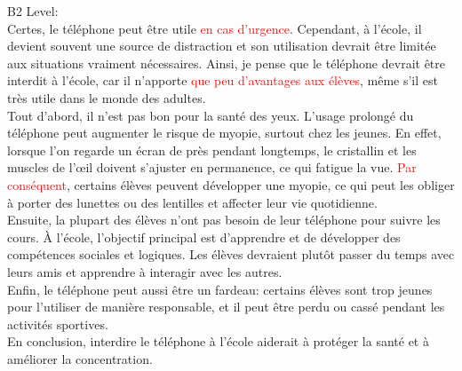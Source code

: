 \documentclass{book}
\begin{document}
            B2 Level: \\
            Certes, le téléphone peut être utile \textcolor{red}{en cas d'urgence}. 
            Cependant, à l'école, il devient souvent une source de distraction et son utilisation devrait être limitée aux situations vraiment nécessaires.
            Ainsi, je pense que le téléphone devrait être interdit à l'école, car il n'apporte \textcolor{red}{que peu d'avantages aux élèves}, même s'il est très utile dans le monde des adultes. \\
            Tout d'abord, il n'est pas bon pour la santé des yeux. 
            L'usage prolongé du téléphone peut augmenter le risque de myopie, surtout chez les jeunes. 
            En effet, lorsque l'on regarde un écran de près pendant longtemps, le cristallin et les muscles de l'œil doivent s'ajuster en permanence, ce qui fatigue la vue.
            \textcolor{red}{Par conséquent}, certains élèves peuvent développer une myopie, ce qui peut les obliger à porter des lunettes ou des lentilles et affecter leur vie quotidienne. \\
            Ensuite, la plupart des élèves n'ont pas besoin de leur téléphone pour suivre les cours. 
            À l'école, l'objectif principal est d'apprendre et de développer des compétences sociales et logiques. 
            Les élèves devraient plutôt passer du temps avec leurs amis et apprendre à interagir avec les autres. \\
            Enfin, le téléphone peut aussi être un fardeau: certains élèves sont trop jeunes pour l'utiliser de manière responsable,
            et il peut être perdu ou cassé pendant les activités sportives. \\
            En conclusion, interdire le téléphone à l'école aiderait à protéger la santé et à améliorer la concentration.
\end{document}
